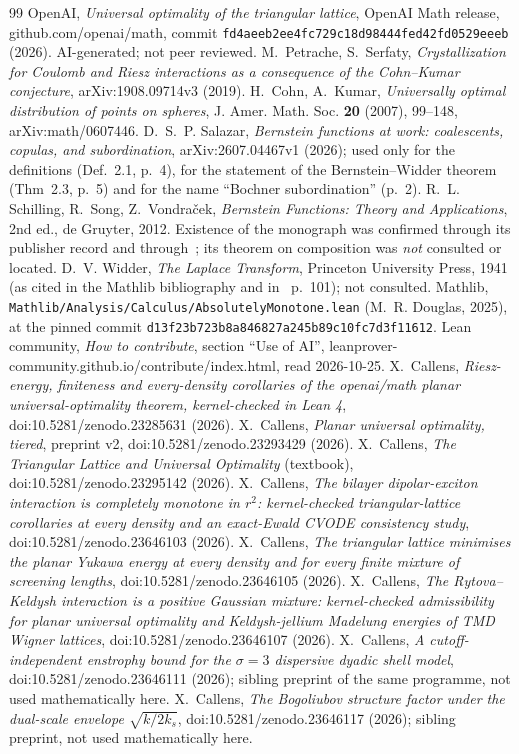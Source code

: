\documentclass[10pt]{article}
\theoremstyle{remark}
\begin{document}
\begin{thebibliography}{99}\footnotesize
{} OpenAI, \emph{Universal optimality of the triangular lattice}, OpenAI Math release, github.com/openai/math,
commit \texttt{fd4aeeb2ee4fc729c18d98444fed42fd0529eeeb} (2026). AI-generated; not peer reviewed.
 M.~Petrache, S.~Serfaty, \emph{Crystallization for Coulomb and Riesz interactions as a consequence of the
Cohn--Kumar conjecture}, arXiv:1908.09714v3 (2019).
 H.~Cohn, A.~Kumar, \emph{Universally optimal distribution of points on spheres}, J. Amer. Math. Soc. \textbf{20}
(2007), 99--148, arXiv:math/0607446.
 D.~S.~P. Salazar, \emph{Bernstein functions at work: coalescents, copulas, and subordination}, arXiv:2607.04467v1 (2026);
used only for the definitions (Def.~2.1, p.~4), for the statement of the Bernstein--Widder theorem (Thm~2.3, p.~5) and for the name ``Bochner subordination'' (p.~2).
 R.~L. Schilling, R.~Song, Z.~Vondra\v{c}ek, \emph{Bernstein Functions: Theory and Applications}, 2nd ed., de Gruyter, 2012.
Existence of the monograph was confirmed through its publisher record and through~\cite{sal}; its theorem on composition was
\emph{not} consulted or located.
 D.~V. Widder, \emph{The Laplace Transform}, Princeton University Press, 1941 (as cited in the Mathlib
bibliography and in~\cite{ck} p.~101); not consulted.
 Mathlib, \texttt{Mathlib/Analysis/Calculus/AbsolutelyMonotone.lean} (M.~R. Douglas, 2025), at the pinned commit
\texttt{d13f23b723b8a846827a245b89c10fc7d3f11612}.
 Lean community, \emph{How to contribute}, section ``Use of AI'', leanprover-community.github.io/contribute/index.html,
read 2026-10-25.
 X.~Callens, \emph{Riesz-energy, finiteness and every-density corollaries of the openai/math planar
universal-optimality theorem, kernel-checked in Lean 4}, doi:10.5281/zenodo.23285631 (2026).
 X.~Callens, \emph{Planar universal optimality, tiered}, preprint v2, doi:10.5281/zenodo.23293429 (2026).
 X.~Callens, \emph{The Triangular Lattice and Universal Optimality} (textbook), doi:10.5281/zenodo.23295142 (2026).
 X.~Callens, \emph{The bilayer dipolar-exciton interaction is completely monotone in $r^2$: kernel-checked
triangular-lattice corollaries at every density and an exact-Ewald CVODE consistency study}, doi:10.5281/zenodo.23646103 (2026).
 X.~Callens, \emph{The triangular lattice minimises the planar Yukawa energy at every density and for every finite
mixture of screening lengths}, doi:10.5281/zenodo.23646105 (2026).
 X.~Callens, \emph{The Rytova--Keldysh interaction is a positive Gaussian mixture: kernel-checked admissibility
for planar universal optimality and Keldysh-jellium Madelung energies of TMD Wigner lattices}, doi:10.5281/zenodo.23646107 (2026).
 X.~Callens, \emph{A cutoff-independent enstrophy bound for the $\sigma=3$ dispersive dyadic shell model},
doi:10.5281/zenodo.23646111 (2026); sibling preprint of the same programme, not used mathematically here.
 X.~Callens, \emph{The Bogoliubov structure factor under the dual-scale envelope $\sqrt{k/2k_s}$},
doi:10.5281/zenodo.23646117 (2026); sibling preprint, not used mathematically here.
\end{thebibliography}
\end{document}
